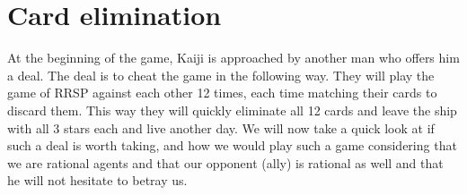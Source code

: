 \documentclass[11pt]{article}
\begin{document}
\section{Card elimination}
At the beginning of the game, Kaiji is approached by another man who offers him a deal. The deal is to cheat the game in the following way. They will play the game of RRSP against each other 12 times, each time matching their cards to discard them. This way they will quickly eliminate all 12 cards and leave the ship with all 3 stars each and live another day. We will now take a quick look at if such a deal is worth taking, and how we would play such a game considering that we are rational agents and that our opponent (ally) is rational as well and that he will not hesitate to betray us. 
\end{document}

